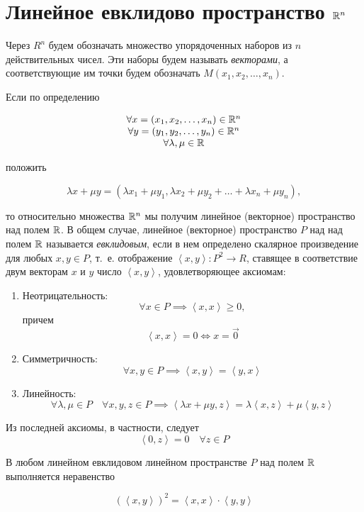 \documentclass[../../main.tex]{subfiles}
\begin{document}
\section{Линейное евклидово пространство $\mathbb{R}^n$}

Через $R^n$ будем обозначать множество упорядоченных наборов из $n$
действительных чисел. Эти наборы будем называть \textit{векторами},
а соответствующие им точки будем обозначать $M(x_1, x_2, \dots, x_n)$.

Если по определению

\[
\begin{array}{c}
 \forall x = (x_1, x_2, \dots, x_n) \in \mathbb{R}^n \\
 \forall y = (y_1, y_2, \dots, y_n) \in \mathbb{R}^n \\
 \forall \lambda, \mu \in \mathbb{R}
\end{array}
\]

положить

\[\lambda x + \mu y = (\lambda x_1 + \mu y_1, \lambda x_2 + \mu y_2 + 
\dots + \lambda x_n + \mu y_n),\]

то относительно множества $\mathbb{R}^n$ мы получим линейное (векторное) 
пространство над полем $\mathbb{R}$. В общем случае, линейное (векторное) 
пространство $P$ над над полем $\mathbb{R}$ называется \textit{евклидовым},
если в нем определено скалярное произведение для любых $x, y \in P$, 
т.~е. отображение $\left<x, y\right>: P^2 \to R$, ставящее в 
соответствие двум векторам $x$ и $y$ число $\left<x, y\right>$, 
удовлетворяющее аксиомам:

\begin{enumerate}
 \item Неотрицательность:
 \[\forall x \in P \implies \left<x, x\right> \ge 0,\]
 причем
 \[\left<x, x\right> = 0 \iff x = \vec 0\]
 \item Симметричность:
 \[\forall x, y \in P \implies \left<x, y\right> = \left<y, x\right>\]
 \item Линейность:
 \[\forall \lambda, \mu \in P \quad \forall x, y, z \in P \implies
 \left<\lambda x + \mu y, z\right> = \lambda\left<x, z\right> + 
 \mu\left<y, z\right>\]
\end{enumerate}

Из последней аксиомы, в частности, следует \[\left<0, z\right> = 0 
\quad \forall z \in P\]

\begin{thm}
 В любом линейном евклидовом линейном пространстве $P$ над полем $\mathbb{R}$
 выполняется неравенство
 
 \begin{equation}
  \label{kosh-bun}
  (\left<x, y\right>)^2 = \left<x, x\right>\cdot\left<y, y\right>
 \end{equation}
\end{thm}
\end{document}
